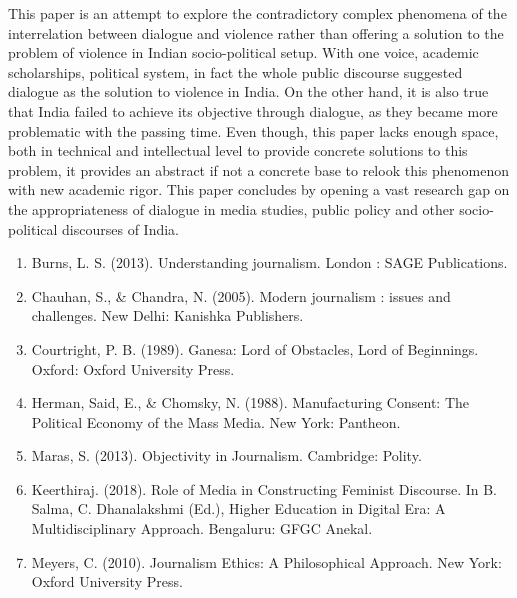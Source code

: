 \begin{multicols}{2}

\noi
This paper is an attempt to explore the contradictory complex phenomena of the interrelation
between dialogue and violence rather than offering a solution to the problem of violence in Indian
socio-political setup. With one voice, academic scholarships, political system, in fact the whole
public discourse suggested dialogue as the solution to violence in India. On the other hand, it is
also true that India failed to achieve its objective through dialogue, as they became more
problematic with the passing time. Even though, this paper lacks enough space, both in technical
and intellectual level to provide concrete solutions to this problem, it provides an abstract if not a
concrete base to relook this phenomenon with new academic rigor. This paper concludes by
opening a vast research gap on the appropriateness of dialogue in media studies, public policy
and other socio-political discourses of India.


\vspace{-.2cm}

\begin{enumerate}[label=$\bullet$]
\item Burns, L. S. (2013). Understanding journalism. London : SAGE Publications.

\item Chauhan, S., \& Chandra, N. (2005). Modern journalism : issues and challenges. New Delhi: Kanishka Publishers.

\item Courtright, P. B. (1989). Ganesa: Lord of Obstacles, Lord of Beginnings. Oxford: Oxford University Press.

\item Herman, Said, E., \& Chomsky, N. (1988). Manufacturing Consent: The Political Economy of the Mass Media. New York: Pantheon. 

\item Maras, S. (2013). Objectivity in Journalism. Cambridge: Polity.

\item Keerthiraj. (2018). Role of Media in Constructing Feminist Discourse. In B. Salma, C. Dhanalakshmi (Ed.), Higher Education in Digital Era: A Multidisciplinary Approach. Bengaluru: GFGC Anekal.

\item Meyers, C. (2010). Journalism Ethics: A Philosophical Approach. New York: Oxford
University Press.


\end{enumerate}
\end{multicols}
